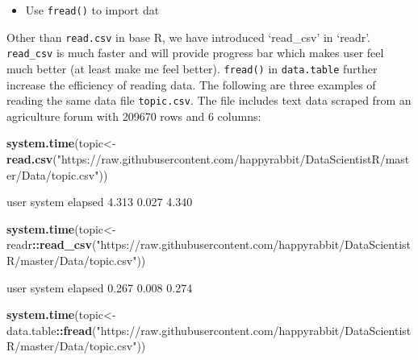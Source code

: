 \documentclass[12pt,]{krantz}
\newenvironment{Shaded}{\begin{snugshade}}{\end{snugshade}}
\newcommand{\KeywordTok}[1]{\textcolor[rgb]{0.13,0.29,0.53}{\textbf{#1}}}
\newcommand{\StringTok}[1]{\textcolor[rgb]{0.31,0.60,0.02}{#1}}
\newcommand{\OperatorTok}[1]{\textcolor[rgb]{0.81,0.36,0.00}{\textbf{#1}}}
\newcommand{\NormalTok}[1]{#1}
\providecommand{\tightlist}{%
  \setlength{\itemsep}{0pt}\setlength{\parskip}{0pt}}
\theoremstyle{definition}
\theoremstyle{definition}
\theoremstyle{definition}
\theoremstyle{remark}
\begin{document}
\begin{itemize}
\tightlist
\item
  Use \texttt{fread()} to import dat
\end{itemize}

Other than \texttt{read.csv} in base R, we have introduced `read\_csv'
in `readr'. \texttt{read\_csv} is much faster and will provide progress
bar which makes user feel much better (at least make me feel better).
\texttt{fread()} in \texttt{data.table} further increase the efficiency
of reading data. The following are three examples of reading the same
data file \texttt{topic.csv}. The file includes text data scraped from
an agriculture forum with 209670 rows and 6 columns:

\begin{Shaded}
\begin{Highlighting}[]
\KeywordTok{system.time}\NormalTok{(topic<-}\KeywordTok{read.csv}\NormalTok{(}\StringTok{"https://raw.githubusercontent.com/happyrabbit/DataScientistR/master/Data/topic.csv"}\NormalTok{))}
\end{Highlighting}
\end{Shaded}

\begin{Shaded}
\begin{Highlighting}[]
\NormalTok{  user  system elapsed }
\NormalTok{  4.313   0.027   4.340}
\end{Highlighting}
\end{Shaded}

\begin{Shaded}
\begin{Highlighting}[]
\KeywordTok{system.time}\NormalTok{(topic<-readr}\OperatorTok{::}\KeywordTok{read_csv}\NormalTok{(}\StringTok{"https://raw.githubusercontent.com/happyrabbit/DataScientistR/master/Data/topic.csv"}\NormalTok{))}
\end{Highlighting}
\end{Shaded}

\begin{Shaded}
\begin{Highlighting}[]
\NormalTok{   user  system elapsed }
\NormalTok{  0.267   0.008   0.274 }
\end{Highlighting}
\end{Shaded}

\begin{Shaded}
\begin{Highlighting}[]
\KeywordTok{system.time}\NormalTok{(topic<-data.table}\OperatorTok{::}\KeywordTok{fread}\NormalTok{(}\StringTok{"https://raw.githubusercontent.com/happyrabbit/DataScientistR/master/Data/topic.csv"}\NormalTok{))}
\end{Highlighting}
\end{Shaded}
\end{document}
